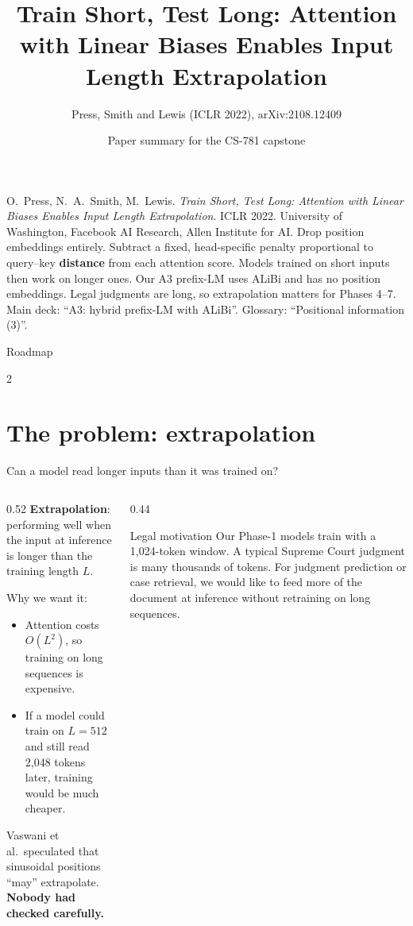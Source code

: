 \documentclass[aspectratio=169,11pt]{beamer}
\title[ALiBi]{Train Short, Test Long: Attention with Linear Biases Enables Input Length Extrapolation}
\subtitle{Press, Smith and Lewis (ICLR 2022), arXiv:2108.12409}
\author[Paper summary]{Paper summary for the CS-781 capstone}
\date{}
\begin{document}
\begin{frame}\titlepage\end{frame}

\paperglance
{O.\ Press, N.\ A.\ Smith, M.\ Lewis. \emph{Train Short, Test Long: Attention with Linear Biases Enables Input Length Extrapolation}. ICLR 2022. University of Washington, Facebook AI Research, Allen Institute for AI.}
{Drop position embeddings entirely. Subtract a fixed, head-specific penalty proportional to query--key \textbf{distance} from each attention score. Models trained on short inputs then work on longer ones.}
{Our A3 prefix-LM uses ALiBi and has no position embeddings. Legal judgments are long, so extrapolation matters for Phases 4--7.}
{Main deck: ``A3: hybrid prefix-LM with ALiBi''. Glossary: ``Positional information (3)''.}

\begin{frame}{Roadmap}
  \begin{multicols}{2}\small\tableofcontents\end{multicols}
\end{frame}

\section{The problem: extrapolation}

\begin{frame}{Can a model read longer inputs than it was trained on?}
  \begin{columns}[T]
    \begin{column}{0.52\textwidth}
      \small
      \textbf{Extrapolation}: performing well when the input at inference is longer than the training length $L$.
      \vspace{1mm}

      Why we want it:
      \begin{itemize}
        \item Attention costs $O(L^2)$, so training on long sequences is expensive.
        \item If a model could train on $L=512$ and still read 2,048 tokens later, training would be much cheaper.
      \end{itemize}
      Vaswani et al.\ speculated that sinusoidal positions ``may'' extrapolate. \textbf{Nobody had checked carefully.}
    \end{column}
    \begin{column}{0.44\textwidth}
      \begin{exampleblock}{Legal motivation}
        \small
        Our Phase-1 models train with a 1,024-token window. A typical Supreme Court judgment is many thousands of tokens.
        For judgment prediction or case retrieval, we would like to feed more of the document at inference without retraining on long sequences.
      \end{exampleblock}
    \end{column}
  \end{columns}
\end{frame}
\end{document}
